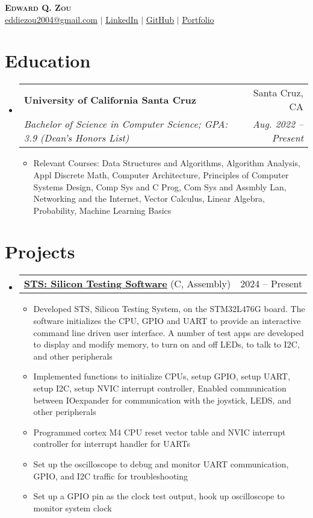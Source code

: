 \documentclass[letterpaper,11pt]{article}
\makeatletter
\newcommand{\resumeItem}[1]{
  \item\small{
    {#1 \vspace{-2pt}}
  }
}
\newcommand{\resumeSubheading}[4]{
  \vspace{-2pt}\item
    \begin{tabular*}{0.97\textwidth}[t]{l@{\extracolsep{\fill}}r}
      \textbf{#1} & #2 \\
      \textit{\small#3} & \textit{\small #4} \\
    \end{tabular*}\vspace{-7pt}
}
\newcommand{\resumeProjectHeading}[2]{
    \item
    \begin{tabular*}{0.97\textwidth}[t]{l@{\extracolsep{\fill}}r}
      \small#1 & #2 \\
    \end{tabular*}\vspace{-7pt}
}
\newcommand{\resumeSubHeadingListStart}{\begin{itemize}[leftmargin=0.15in, label={}]}
\newcommand{\resumeSubHeadingListEnd}{\end{itemize}}
\newcommand{\resumeItemListStart}{\begin{itemize}}
\newcommand{\resumeItemListEnd}{\end{itemize}\vspace{-5pt}}
\makeatother
\begin{document}
\begin{center}
    \textbf{\Huge \scshape Edward Q. Zou} \\ \vspace{1pt}
    \small \href{mailto:eddiezou2004@gmail.com}{\underline{eddiezou2004@gmail.com}} $|$ 
    \href{https://linkedin.com/in/edward-zou-13bb77182}{\underline{LinkedIn}} $|$
    \href{https://github.com/ezouu}{\underline{GitHub}} $|$
    \href{https://edwardportfolio-lyart.vercel.app/}{\underline{Portfolio}}
\end{center}

\section{Education}
  \resumeSubHeadingListStart
    \resumeSubheading
      {University of California Santa Cruz}{Santa Cruz, CA}
      {Bachelor of Science in Computer Science; GPA: 3.9 (Dean’s Honors List)}{Aug. 2022 -- Present}
      \resumeItemListStart
        \resumeItem{Relevant Courses: Data Structures and Algorithms, Algorithm Analysis, Appl Discrete Math, Computer Architecture, Principles of Computer Systems Design, Comp Sys and C Prog, Com Sys and Assmbly Lan, Networking and the Internet, Vector Calculus, Linear Algebra, Probability, Machine Learning Basics}
      \resumeItemListEnd
  \resumeSubHeadingListEnd

\section{Projects}
  \resumeSubHeadingListStart
    \resumeProjectHeading
      {\href{https://github.com/ezouu/my_sts}{\underline{\textbf{STS: Silicon Testing Software}}} \textnormal{(C, Assembly)}}{2024 -- Present}
      \resumeItemListStart
        \resumeItem{Developed STS, Silicon Testing System, on the STM32L476G board. The software initializes the CPU, GPIO and UART to provide an interactive command line driven user interface. A number of test apps are developed to display and modify memory, to turn on and off LEDs, to talk to I2C, and other peripherals}
        \resumeItem{Implemented functions to initialize CPUs, setup GPIO, setup UART, setup I2C, setup NVIC interrupt controller, Enabled communication between IOexpander for communication with the joystick, LEDS, and other peripherals}
        \resumeItem{Programmed cortex M4 CPU reset vector table and NVIC interrupt controller for interrupt handler for UARTs}
        \resumeItem{Set up the oscilloscope to debug and monitor UART communication, GPIO, and I2C traffic for troubleshooting}
        \resumeItem{Set up a GPIO pin as the clock test output, hook up oscilloscope to monitor system clock} 
      \resumeItemListEnd
  \resumeSubHeadingListEnd
\end{document}

